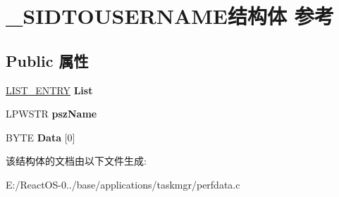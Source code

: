 \hypertarget{struct___s_i_d_t_o_u_s_e_r_n_a_m_e}{}\section{\+\_\+\+S\+I\+D\+T\+O\+U\+S\+E\+R\+N\+A\+M\+E结构体 参考}
\label{struct___s_i_d_t_o_u_s_e_r_n_a_m_e}
\subsection*{Public 属性}
\begin{DoxyCompactItemize}
\item 
\mbox{\label{struct___s_i_d_t_o_u_s_e_r_n_a_m_e_aedc264fac22a56d5e93ae486da796397}} 
\hyperlink{struct___l_i_s_t___e_n_t_r_y}{L\+I\+S\+T\+\_\+\+E\+N\+T\+RY} {\bfseries List}
\item 
\mbox{\label{struct___s_i_d_t_o_u_s_e_r_n_a_m_e_a0a125a476cdea7d019cc695a34432992}} 
L\+P\+W\+S\+TR {\bfseries psz\+Name}
\item 
\mbox{\label{struct___s_i_d_t_o_u_s_e_r_n_a_m_e_adc5a5631d9b67c121210886cfb5c28c6}} 
B\+Y\+TE {\bfseries Data} \mbox{[}0\mbox{]}
\end{DoxyCompactItemize}


该结构体的文档由以下文件生成\+:\begin{DoxyCompactItemize}
\item 
E\+:/\+React\+O\+S-\/0../base/applications/taskmgr/perfdata.\+c\end{DoxyCompactItemize}
